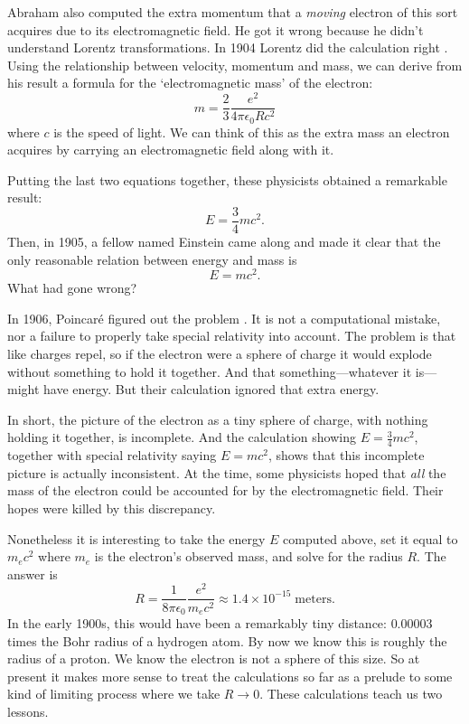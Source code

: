 \documentclass{article}
\begin{document}
Abraham also computed the extra momentum that a \emph{moving} electron of this sort acquires due to its electromagnetic field.   He got it wrong because he didn't understand Lorentz transformations.  In 1904 Lorentz did the calculation right \cite{Lorentz}.
Using the relationship between velocity, momentum and mass, we can derive from his result a formula for the `electromagnetic mass' of the electron:
\[    m =  \frac{2}{3} \frac{e^2}{4 \pi \epsilon_0 R c^2}  \]
where $c$ is the speed of light.  We can think of this as the extra mass an electron acquires by carrying an electromagnetic field along with it.  

Putting the last two equations together, these physicists obtained a remarkable result:
\[  E = \frac{3}{4} mc^2 .\]
Then, in 1905, a fellow named Einstein came along and made it clear that the only reasonable relation between energy and mass is
\[   E = mc^2 .\]
What had gone wrong?  

In 1906, Poincar\'e figured out the problem \cite{Poincare}.  It is not a computational mistake, nor a failure to properly take special relativity into account.   The problem is that like charges repel, so if the electron were a sphere of charge it would explode without something to hold it together.   And that something---whatever it is---might have energy.  But their calculation ignored that extra energy.  

In short, the picture of the electron as a tiny sphere of charge, with nothing holding it together, is incomplete.   And the calculation showing $E = \frac{3}{4}mc^2$, together with special relativity saying $E = mc^2$, shows that this incomplete picture is actually inconsistent.  At the time, some physicists hoped that \emph{all} the mass of the electron could be accounted for by the electromagnetic field.  Their hopes were killed by
this discrepancy.

Nonetheless it is interesting to take the energy $E$ computed above, set it equal to $m_e c^2$ where $m_e$ is the electron's observed mass, and solve for the radius $R$.  The answer is 
\[     \displaystyle{  R = \frac{1}{8 \pi \epsilon_0} \frac{e^2}{m_e c^2} } \approx
1.4 \times 10^{-15} \; \mathrm{meters} .\]
In the early 1900s, this would have been a remarkably tiny distance: $0.00003$ times the Bohr radius of a hydrogen atom.  By now we know this is roughly the radius of a proton.  
We know the electron is not a sphere of this size.  So at present it makes more sense to treat the calculations so far as a prelude to some kind of limiting process where we take $R \to 0$.  These calculations teach us two lessons.  
\end{document}
